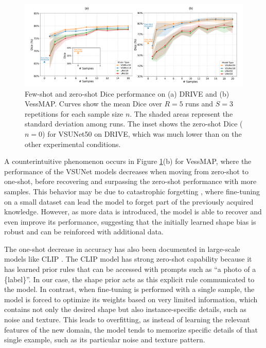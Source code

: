 \documentclass[%
reprint,
nofootinbib,
 amsmath,amssymb,
aps,
superscriptaddress,
showkeys,
longbibliography
]{revtex4-1}
\begin{document}
\begin{figure}[tbp]
    \centering
    \includegraphics[width=\textwidth]{figures/results/results_charts.pdf}
    \caption{Few-shot and zero-shot Dice performance on (a) DRIVE and (b) VessMAP. Curves show the mean Dice over $R{=}5$ runs and $S{=}3$ repetitions for each sample size $n$. The shaded areas represent the standard deviation among runs. The inset shows the zero-shot Dice ($n{=}0$) for VSUNet50 on DRIVE, which was much lower than on the other experimental conditions.}
    \label{f:results_charts}
\end{figure}

A counterintuitive phenomenon occurs in Figure \ref{f:results_charts}(b) for VessMAP, where the performance of the VSUNet models decreases when moving from zero-shot to one-shot, before recovering and surpassing the zero-shot performance with more samples. This behavior may be due to catastrophic forgetting \cite{MCCLOSKEY1989109}, where fine-tuning on a small dataset can lead the model to forget part of the previously acquired knowledge. However, as more data is introduced, the model is able to recover and even improve its performance, suggesting that the initially learned shape bias is robust and can be reinforced with additional data.

The one-shot decrease in accuracy has also been documented in large-scale models like CLIP \cite{Radford2021LearningTV}. The CLIP model has strong zero-shot capability because it has learned prior rules that can be accessed with prompts such as ``a photo of a \{label\}''. In our case, the shape prior acts as this explicit rule communicated to the model. In contrast, when fine-tuning is performed with a single sample, the model is forced to optimize its weights based on very limited information, which contains not only the desired shape but also instance-specific details, such as noise and texture. This leads to overfitting, as instead of learning the relevant features of the new domain, the model tends to memorize specific details of that single example, such as its particular noise and texture pattern.
\end{document}
